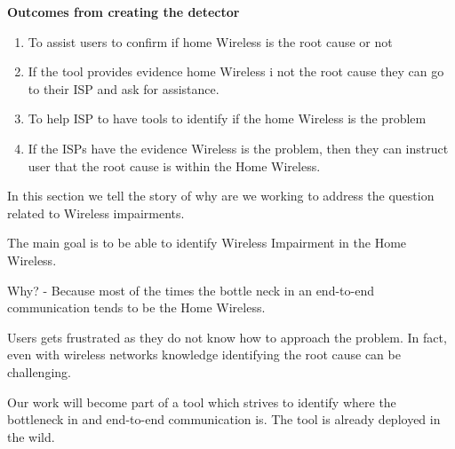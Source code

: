 \textbf{Outcomes from creating the detector}

\begin{enumerate}
	\item To assist users to confirm if home Wireless is the root cause or not
	\item If the tool provides evidence home Wireless i not the root cause they can go to their ISP and ask for assistance.
	\item To help ISP to have tools to identify if the home Wireless is the problem
	\item If the ISPs have the evidence Wireless is the problem, then they can instruct user that the root cause is within the Home Wireless.
\end{enumerate}


In this section we tell the story of why are we working to address the question related to Wireless impairments.

The main goal is to be able to identify Wireless Impairment in the Home Wireless.

Why? - Because most of the times the bottle neck in an end-to-end communication tends to be the Home Wireless.

Users gets frustrated as they do not know how to approach the problem. In fact, even with wireless networks knowledge identifying the root cause can be challenging.

Our work will become part of a tool which strives to identify where the bottleneck in and end-to-end communication is. The tool is already deployed in the wild.